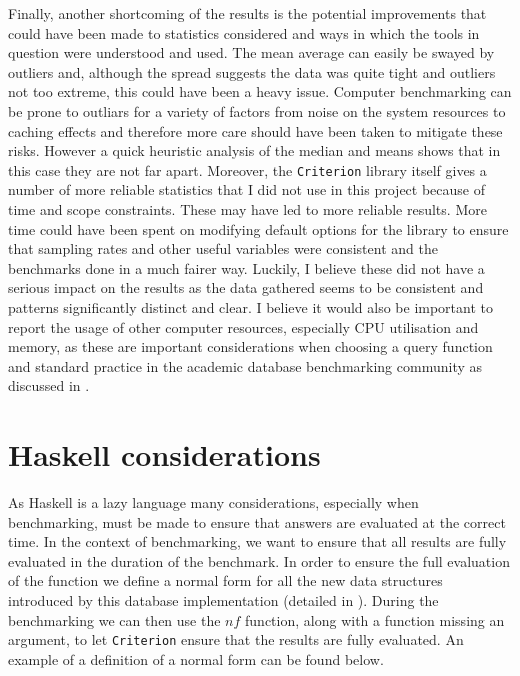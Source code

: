 Finally, another shortcoming of the results is the potential improvements that
could have been made to statistics considered and ways in which the tools in
question were understood and used. The mean average can easily be swayed by
outliers and, although the spread suggests the data was quite tight and
outliers not too extreme, this could have been a heavy issue. Computer
benchmarking can be prone to outliars for a variety of factors from noise on the
system resources to caching effects and therefore more care should have been
taken to mitigate these risks. However a quick heuristic analysis of the median
and means shows that in this case they are not far apart. Moreover, the
\verb|Criterion| library itself gives a number of more reliable statistics that
I did not use in this project because of time and scope constraints. These may
have led to more reliable results. More time could have been spent on modifying
default options for the library to ensure that sampling rates and other useful
variables were consistent and the benchmarks done in a much fairer way. Luckily,
I believe these did not have a serious impact on the results as the data
gathered seems to be consistent and patterns significantly distinct and clear. I
believe it would also be important to report the usage of other computer
resources, especially CPU utilisation and memory, as these are important
considerations when choosing a query function and standard practice in the academic
database benchmarking community as discussed in
.

\section{Haskell considerations}
As Haskell is a lazy language many considerations, especially when benchmarking,
must be made to ensure that answers are evaluated at the correct time. In the
context of benchmarking, we want to ensure that all results are fully evaluated
in the duration of the benchmark. In order to ensure the full evaluation of the
function we define a normal form for all the new data structures introduced by
this database implementation (detailed in ). During the
benchmarking we can then use the $nf$ function, along with a function missing an
argument, to let \verb|Criterion| ensure that the results are fully evaluated.
An example of a definition of a normal form can be found below.



